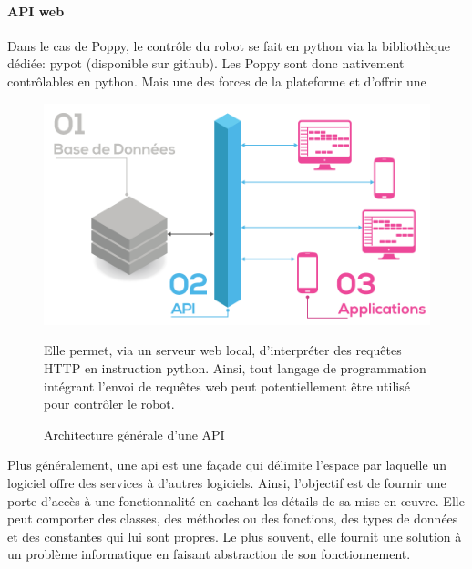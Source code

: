             \paragraph{API web}\label{sec:API}
                Dans le cas de Poppy, le contrôle du robot se fait en python via la bibliothèque dédiée: pypot (disponible sur github). Les Poppy sont donc nativement contrôlables en python. Mais une des forces de la plateforme et d'offrir une 
                \begin{figure}[!h]
                \begin{minipage}{0.525\linewidth}
                    \centering
                    \includegraphics[width=0.9\linewidth]{Figures/Open_classroom-api}
                    \caption{Architecture générale d'une API}\label{fig:API}
                \end{minipage}
                \hfill
                \begin{minipage}{0.445\linewidth}
                \myDefautStyle
                     Elle permet, via un serveur web local, d'interpréter des requêtes HTTP en instruction python. Ainsi, tout langage de programmation intégrant l'envoi de requêtes web peut potentiellement être utilisé pour contrôler le robot.
                     \\
                \end{minipage}
                \end{figure}\par%
                Plus généralement, une \glsdesc{api} est une façade qui délimite l'espace par laquelle un logiciel offre des services à d'autres logiciels. Ainsi, l'objectif est de fournir une porte d'accès à une fonctionnalité en cachant les détails de sa mise en œuvre. Elle peut comporter des classes, des méthodes ou des fonctions, des types de données et des constantes qui lui sont propres. Le plus souvent, elle fournit une solution à un problème informatique en faisant abstraction de son fonctionnement.
